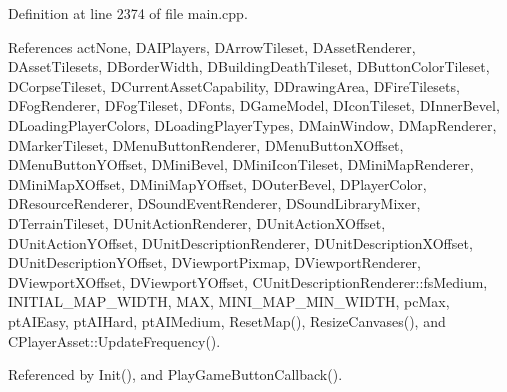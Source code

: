 Definition at line 2374 of file main.\+cpp.



References act\+None, D\+A\+I\+Players, D\+Arrow\+Tileset, D\+Asset\+Renderer, D\+Asset\+Tilesets, D\+Border\+Width, D\+Building\+Death\+Tileset, D\+Button\+Color\+Tileset, D\+Corpse\+Tileset, D\+Current\+Asset\+Capability, D\+Drawing\+Area, D\+Fire\+Tilesets, D\+Fog\+Renderer, D\+Fog\+Tileset, D\+Fonts, D\+Game\+Model, D\+Icon\+Tileset, D\+Inner\+Bevel, D\+Loading\+Player\+Colors, D\+Loading\+Player\+Types, D\+Main\+Window, D\+Map\+Renderer, D\+Marker\+Tileset, D\+Menu\+Button\+Renderer, D\+Menu\+Button\+X\+Offset, D\+Menu\+Button\+Y\+Offset, D\+Mini\+Bevel, D\+Mini\+Icon\+Tileset, D\+Mini\+Map\+Renderer, D\+Mini\+Map\+X\+Offset, D\+Mini\+Map\+Y\+Offset, D\+Outer\+Bevel, D\+Player\+Color, D\+Resource\+Renderer, D\+Sound\+Event\+Renderer, D\+Sound\+Library\+Mixer, D\+Terrain\+Tileset, D\+Unit\+Action\+Renderer, D\+Unit\+Action\+X\+Offset, D\+Unit\+Action\+Y\+Offset, D\+Unit\+Description\+Renderer, D\+Unit\+Description\+X\+Offset, D\+Unit\+Description\+Y\+Offset, D\+Viewport\+Pixmap, D\+Viewport\+Renderer, D\+Viewport\+X\+Offset, D\+Viewport\+Y\+Offset, C\+Unit\+Description\+Renderer\+::fs\+Medium, I\+N\+I\+T\+I\+A\+L\+\_\+\+M\+A\+P\+\_\+\+W\+I\+D\+TH, M\+AX, M\+I\+N\+I\+\_\+\+M\+A\+P\+\_\+\+M\+I\+N\+\_\+\+W\+I\+D\+TH, pc\+Max, pt\+A\+I\+Easy, pt\+A\+I\+Hard, pt\+A\+I\+Medium, Reset\+Map(), Resize\+Canvases(), and C\+Player\+Asset\+::\+Update\+Frequency().



Referenced by Init(), and Play\+Game\+Button\+Callback().


